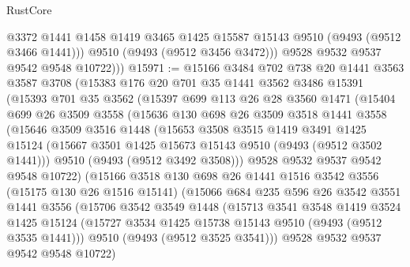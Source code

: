 \begin{lexlean}{RustCore}
\begin{coremodule}
              @3372
              @1441
              @1458
              @1419
              @3465
              @1425
              @15587
              @15143
              @9510
              (@9493 (@9512 @3466 @1441)))
            @9510
            (@9493 (@9512 @3456 @3472)))
          @9528
          @9532
          @9537
          @9542
          @9548
          @10722)))
@15971 := @15166
    @3484
    @702
    @738
    @20
    @1441
    @3563
    @3587
    @3708
    (@15383
      @176
      @20
      @701
      @35
      @1441
      @3562
      @3486
      @15391
      (@15393
        @701
        @35
        @3562
        (@15397
          @699
          @113
          @26
          @28
          @3560
          @1471
          (@15404
            @699
            @26
            @3509
            @3558
            (@15636
              @130
              @698
              @26
              @3509
              @3518
              @1441
              @3558
              (@15646
                @3509
                @3516
                @1448
                (@15653
                  @3508
                  @3515
                  @1419
                  @3491
                  @1425
                  @15124
                  (@15667 @3501 @1425 @15673 @15143 @9510 (@9493 (@9512 @3502 @1441)))
                  @9510
                  (@9493 (@9512 @3492 @3508)))
                @9528
                @9532
                @9537
                @9542
                @9548
                @10722)
              (@15166
                @3518
                @130
                @698
                @26
                @1441
                @1516
                @3542
                @3556
                (@15175 @130 @26 @1516 @15141)
                (@15066
                  @684
                  @235
                  @596
                  @26
                  @3542
                  @3551
                  @1441
                  @3556
                  (@15706
                    @3542
                    @3549
                    @1448
                    (@15713
                      @3541
                      @3548
                      @1419
                      @3524
                      @1425
                      @15124
                      (@15727 @3534 @1425 @15738 @15143 @9510 (@9493 (@9512 @3535 @1441)))
                      @9510
                      (@9493 (@9512 @3525 @3541)))
                    @9528
                    @9532
                    @9537
                    @9542
                    @9548
                    @10722)

\end{coremodule}
\end{lexlean}
